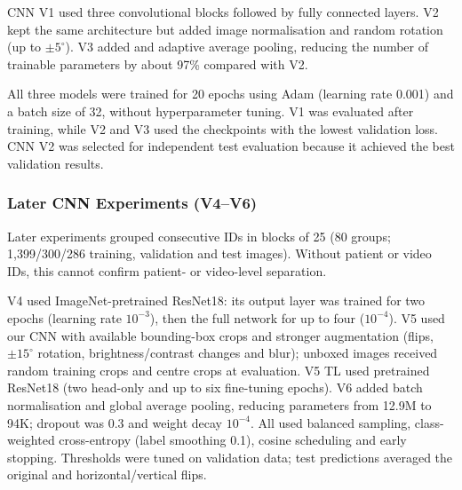 CNN V1 used three convolutional blocks followed by fully connected layers. V2 kept the same architecture but added image normalisation and random rotation (up to $\pm 5^\circ$). V3 added  and adaptive average pooling, reducing the number of trainable parameters by about 97\% compared with V2.

All three models were trained for 20 epochs using Adam (learning rate 0.001) and a batch size of 32, without hyperparameter tuning. V1 was evaluated after training, while V2 and V3 used the checkpoints with the lowest validation loss. CNN V2 was selected for independent test evaluation because it achieved the best validation results.

\subsubsection{Later CNN Experiments (V4--V6)}\label{sec:tl}

Later experiments grouped consecutive IDs in blocks of 25 (80 groups; 1,399/300/286 training, validation and test images). Without patient or video IDs, this cannot confirm patient- or video-level separation.

V4 used ImageNet-pretrained ResNet18: its output layer was trained for two epochs (learning rate $10^{-3}$), then the full network for up to four ($10^{-4}$). V5 used our CNN with available bounding-box crops and stronger augmentation (flips, $\pm15^\circ$ rotation, brightness/contrast changes and blur); unboxed images received random training crops and centre crops at evaluation. V5 TL used pretrained ResNet18 (two head-only and up to six fine-tuning epochs). V6 added batch normalisation and global average pooling, reducing parameters from 12.9M to 94K; dropout was 0.3 and weight decay $10^{-4}$. All used balanced sampling, class-weighted cross-entropy (label smoothing 0.1), cosine scheduling and early stopping. Thresholds were tuned on validation data; test predictions averaged the original and horizontal/vertical flips.

